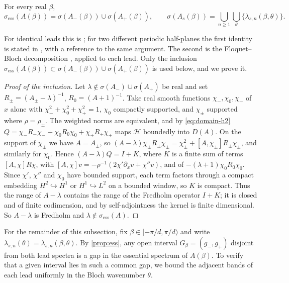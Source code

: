 \begin{proposition}\label{prop:ess}
For every real $\beta$,
\[
  \sigma_{\mathrm{ess}}(A(\beta))=\sigma(A_-(\beta))\cup\sigma(A_+(\beta)),
  \qquad
  \sigma(A_s(\beta))=\bigcup_{n\ge1}\bigcup_{\theta}\{\lambda_{s,n}(\beta,\theta)\}.
\]
\end{proposition}

For identical leads this is \cite[Prop.~3.1]{Fliss2013}; for two different
periodic half-planes the first identity is stated in
\cite[Prop.~2.1]{KlindworthSchmidtFliss2014}, with a reference to the same
argument. The second is the Floquet--Bloch decomposition
\cite{Kuchment1993}, \cite[eq.~(3.3)]{Fliss2013} applied to each lead. Only the
inclusion $\sigma_{\mathrm{ess}}(A(\beta))\subset\sigma(A_-(\beta))\cup
\sigma(A_+(\beta))$ is used below, and we prove it.

\begin{proof}[Proof of the inclusion]
Let $\lambda\notin\sigma(A_-)\cup\sigma(A_+)$ be real and set
$R_\pm=(A_\pm-\lambda)^{-1}$, $R_0=(A+1)^{-1}$. Take real smooth functions
$\chi_-,\chi_0,\chi_+$ of $x$ alone with $\chi_-^2+\chi_0^2+\chi_+^2=1$, $\chi_0$
compactly supported, and $\chi_\pm$ supported where $\rho=\rho_\pm$. The weighted
norms are equivalent, and by \eqref{eq:domain-h2}
$Q=\chi_-R_-\chi_-+\chi_0R_0\chi_0+\chi_+R_+\chi_+$ maps $\mathcal H$ boundedly
into $D(A)$. On the support of $\chi_\pm$ we have $A=A_\pm$, so
$(A-\lambda)\chi_\pm R_\pm\chi_\pm=\chi_\pm^2+[A,\chi_\pm]R_\pm\chi_\pm$, and
similarly for $\chi_0$. Hence $(A-\lambda)Q=I+K$, where $K$ is a finite sum of
terms $[A,\chi]R\chi$, with $[A,\chi]v=-\rho^{-1}(2\chi'\partial_xv+\chi''v)$, and
of $-(\lambda+1)\chi_0R_0\chi_0$. Since $\chi'$, $\chi''$ and $\chi_0$ have
bounded support, each term factors through a compact embedding
$H^2\hookrightarrow H^1$ or $H^1\hookrightarrow L^2$ on a bounded window, so $K$
is compact. Thus the range of $A-\lambda$ contains the range of the Fredholm
operator $I+K$; it is closed and of finite codimension, and by self-adjointness
the kernel is finite dimensional. So $A-\lambda$ is Fredholm and
$\lambda\notin\sigma_{\mathrm{ess}}(A)$.
\end{proof}

For the remainder of this subsection, fix $\beta\in[-\pi/d,\pi/d)$ and write
$\lambda_{s,n}(\theta)=\lambda_{s,n}(\beta,\theta)$.
By \cref{prop:ess}, any open interval $G_\beta=(g_-,g_+)$ disjoint from both
lead spectra is a gap in the essential spectrum of $A(\beta)$. To verify that
a given interval lies in such a common gap, we bound the adjacent bands of
each lead uniformly in the Bloch wavenumber $\theta$.

